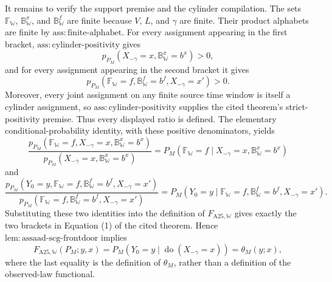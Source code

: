 It remains to verify the support premise and the cylinder compilation.  The sets \(\mathbb F_{\mathbb W}\), \(\mathbb B^x_{\mathbb W}\), and \(\mathbb B^f_{\mathbb W}\) are finite because \(V\), \(L\), and \(\gamma\) are finite.  Their product alphabets are finite by \(\mathrm{ass:finite\text{-}alphabet}\).  For every assignment appearing in the first bracket, \(\mathrm{ass:cylinder\text{-}positivity}\) gives
\[
 p_{P_M}(X_{-\gamma}=x,\mathbb B^x_{\mathbb W}=b^x)>0,
\]
and for every assignment appearing in the second bracket it gives
\[
 p_{P_M}(\mathbb F_{\mathbb W}=f,
 \mathbb B^f_{\mathbb W}=b^f,X_{-\gamma}=x')>0.
\]
Moreover, every joint assignment on any finite source time window is itself a cylinder assignment, so \(\mathrm{ass:cylinder\text{-}positivity}\) supplies the cited theorem's strict-positivity premise.  Thus every displayed ratio is defined.  The elementary conditional-probability identity, with these positive denominators, yields
\[
 \frac{p_{P_M}(\mathbb F_{\mathbb W}=f,X_{-\gamma}=x,
 \mathbb B^x_{\mathbb W}=b^x)}
 {p_{P_M}(X_{-\gamma}=x,\mathbb B^x_{\mathbb W}=b^x)}
 =P_M(\mathbb F_{\mathbb W}=f\mid
 X_{-\gamma}=x,\mathbb B^x_{\mathbb W}=b^x)
\]
and
\[
 \frac{p_{P_M}(Y_0=y,\mathbb F_{\mathbb W}=f,
 \mathbb B^f_{\mathbb W}=b^f,X_{-\gamma}=x')}
 {p_{P_M}(\mathbb F_{\mathbb W}=f,
 \mathbb B^f_{\mathbb W}=b^f,X_{-\gamma}=x')}
 =P_M(Y_0=y\mid\mathbb F_{\mathbb W}=f,
 \mathbb B^f_{\mathbb W}=b^f,X_{-\gamma}=x').
\]
Substituting these two identities into the definition of \(F_{\mathrm{A25},\mathbb W}\) gives exactly the two brackets in Equation (1) of the cited theorem.  Hence \(\mathrm{lem:assaad\text{-}scg\text{-}frontdoor}\) implies
\[
 F_{\mathrm{A25},\mathbb W}(P_M;y,x)
 =P_M(Y_0=y\mid\operatorname{do}(X_{-\gamma}=x))
 =\theta_M(y;x),
\]
where the last equality is the definition of \(\theta_M\), rather than a definition of the observed-law functional.

